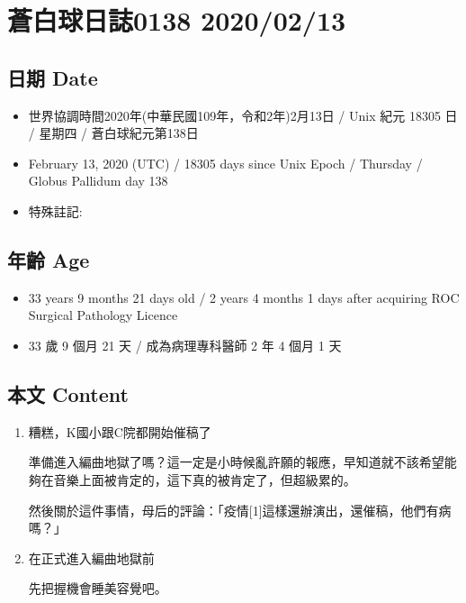 \documentclass[
]{article}
\providecommand{\tightlist}{%
  \setlength{\itemsep}{0pt}\setlength{\parskip}{0pt}}
\begin{document}
\hypertarget{ux84bcux767dux7403ux65e5ux8a8c0138-20200213}{%
\section{蒼白球日誌0138
2020/02/13}\label{ux84bcux767dux7403ux65e5ux8a8c0138-20200213}}

\hypertarget{ux65e5ux671f-date-12}{%
\subsection{日期 Date}\label{ux65e5ux671f-date-12}}

\begin{itemize}
\tightlist
\item
  世界協調時間2020年(中華民國109年，令和2年)2月13日 / Unix 紀元 18305 日
  / 星期四 / 蒼白球紀元第138日
\item
  February 13, 2020 (UTC) / 18305 days since Unix Epoch / Thursday /
  Globus Pallidum day 138
\item
  特殊註記:
\end{itemize}

\hypertarget{ux5e74ux9f61-age-12}{%
\subsection{年齡 Age}\label{ux5e74ux9f61-age-12}}

\begin{itemize}
\tightlist
\item
  33 years 9 months 21 days old / 2 years 4 months 1 days after
  acquiring ROC Surgical Pathology Licence
\item
  33 歲 9 個月 21 天 / 成為病理專科醫師 2 年 4 個月 1 天
\end{itemize}

\hypertarget{ux672cux6587-content-12}{%
\subsection{本文 Content}\label{ux672cux6587-content-12}}

\begin{enumerate}
\def\labelenumi{\arabic{enumi}.}
\item
  糟糕，K國小跟C院都開始催稿了

  準備進入編曲地獄了嗎？這一定是小時候亂許願的報應，早知道就不該希望能夠在音樂上面被肯定的，這下真的被肯定了，但超級累的。

  然後關於這件事情，母后的評論：「疫情{[}1{]}這樣還辦演出，還催稿，他們有病嗎？」
\item
  在正式進入編曲地獄前

  先把握機會睡美容覺吧。
\end{enumerate}
\end{document}

